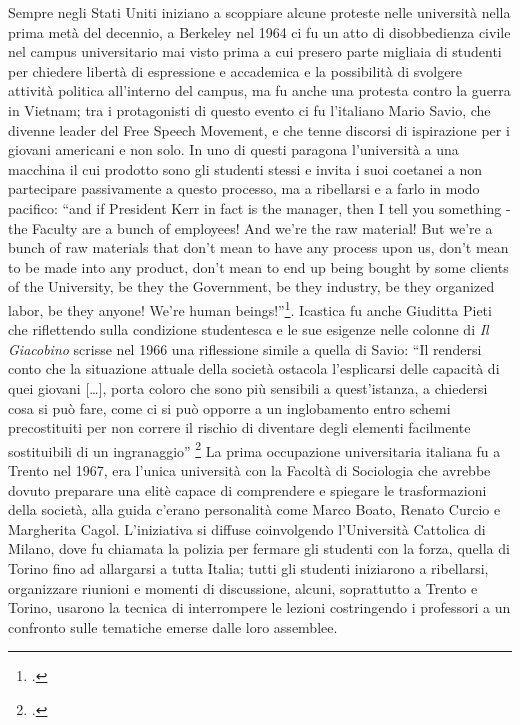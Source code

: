 Sempre negli Stati Uniti iniziano a scoppiare alcune proteste nelle università nella prima metà del decennio, a Berkeley nel 1964 ci fu un atto di disobbedienza civile nel campus universitario mai visto prima a cui presero parte migliaia di studenti per chiedere libertà di espressione e accademica e la possibilità di svolgere attività politica all'interno del campus, ma fu anche una protesta contro la guerra in Vietnam; tra i protagonisti di questo evento ci fu l'italiano Mario Savio, che divenne leader del Free Speech Movement, e che tenne discorsi di ispirazione per i giovani americani e non solo.
In uno di questi paragona l'università a una macchina il cui prodotto sono gli studenti stessi e invita i suoi coetanei a non partecipare passivamente a questo processo, ma a ribellarsi e a farlo in modo pacifico: \enquote{and if President Kerr in fact is the manager, then I tell you something - the Faculty are a bunch of employees! And we're the raw material! But we're a bunch of raw materials that don't mean to have any process upon us, don't mean to be made into any product, don't mean to end up being bought by some clients of the University, be they the Government, be they industry, be they organized labor, be they anyone! We're human beings!}\footcite{Savio}.
Icastica fu anche Giuditta Pieti che riflettendo sulla condizione studentesca e le sue esigenze nelle colonne di \textit{Il Giacobino} scrisse nel 1966 una riflessione simile a quella di Savio: \enquote{Il rendersi conto che la situazione attuale della società ostacola l’esplicarsi delle capacità di quei giovani […], porta coloro che sono più sensibili a quest'istanza, a chiedersi cosa si può fare, come ci si può opporre a un inglobamento entro schemi precostituiti per non correre il rischio di diventare degli elementi facilmente sostituibili di un ingranaggio} \footcite{Pieti}
La prima occupazione universitaria italiana fu a Trento nel 1967, era l'unica università con la Facoltà di Sociologia che avrebbe dovuto preparare una elitè capace di comprendere e spiegare le trasformazioni della società, alla guida c'erano personalità come Marco Boato, Renato Curcio e Margherita Cagol. 
L'iniziativa si diffuse coinvolgendo l'Università Cattolica di Milano, dove fu chiamata la polizia per fermare gli studenti con la forza, quella di Torino fino ad allargarsi a tutta Italia; tutti gli studenti iniziarono a ribellarsi, organizzare riunioni e momenti di discussione, alcuni, soprattutto a Trento e Torino, usarono la tecnica di interrompere le lezioni costringendo i professori a un confronto sulle tematiche emerse dalle loro assemblee.
